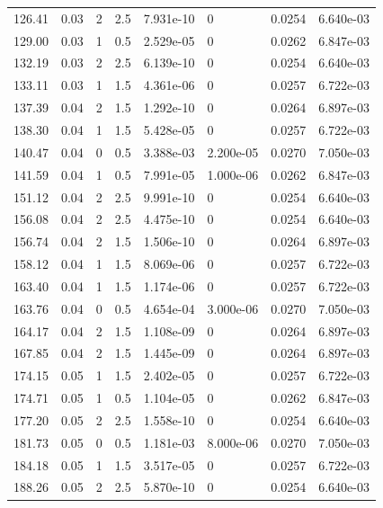 \documentclass[preview]{standalone}
\begin{document}
{{\begin{tabular}{L{1.2cm}C{1.2cm} C{0.3cm}C{0.5cm} C{1.4cm}C{1.4cm} C{1.4cm}C{1.4cm}}
  126.41  &  0.03  & 2     & 2.5 &  7.931e-10  & 0  & 0.0254 &  6.640e-03   \\ 
  129.00  &  0.03  & 1     & 0.5 &  2.529e-05  & 0  & 0.0262 &  6.847e-03   \\ 
  132.19  &  0.03  & 2     & 2.5 &  6.139e-10  & 0  & 0.0254 &  6.640e-03   \\ 
  133.11  &  0.03  & 1     & 1.5 &  4.361e-06  & 0  & 0.0257 &  6.722e-03   \\ 
  137.39  &  0.04  & 2     & 1.5 &  1.292e-10  & 0  & 0.0264 &  6.897e-03   \\ 
  138.30  &  0.04  & 1     & 1.5 &  5.428e-05  & 0  & 0.0257 &  6.722e-03   \\ 
  140.47  &  0.04  & 0     & 0.5 &  3.388e-03  & 2.200e-05  & 0.0270 &  7.050e-03   \\ 
  141.59  &  0.04  & 1     & 0.5 &  7.991e-05  & 1.000e-06  & 0.0262 &  6.847e-03   \\ 
  151.12  &  0.04  & 2     & 2.5 &  9.991e-10  & 0  & 0.0254 &  6.640e-03   \\ 
  156.08  &  0.04  & 2     & 2.5 &  4.475e-10  & 0  & 0.0254 &  6.640e-03   \\ 
  156.74  &  0.04  & 2     & 1.5 &  1.506e-10  & 0  & 0.0264 &  6.897e-03   \\ 
  158.12  &  0.04  & 1     & 1.5 &  8.069e-06  & 0  & 0.0257 &  6.722e-03   \\ 
  163.40  &  0.04  & 1     & 1.5 &  1.174e-06  & 0  & 0.0257 &  6.722e-03   \\ 
  163.76  &  0.04  & 0     & 0.5 &  4.654e-04  & 3.000e-06  & 0.0270 &  7.050e-03   \\ 
  164.17  &  0.04  & 2     & 1.5 &  1.108e-09  & 0  & 0.0264 &  6.897e-03   \\ 
  167.85  &  0.04  & 2     & 1.5 &  1.445e-09  & 0  & 0.0264 &  6.897e-03   \\ 
  174.15  &  0.05  & 1     & 1.5 &  2.402e-05  & 0  & 0.0257 &  6.722e-03   \\ 
  174.71  &  0.05  & 1     & 0.5 &  1.104e-05  & 0  & 0.0262 &  6.847e-03   \\ 
  177.20  &  0.05  & 2     & 2.5 &  1.558e-10  & 0  & 0.0254 &  6.640e-03   \\ 
  181.73  &  0.05  & 0     & 0.5 &  1.181e-03  & 8.000e-06  & 0.0270 &  7.050e-03   \\ 
  184.18  &  0.05  & 1     & 1.5 &  3.517e-05  & 0  & 0.0257 &  6.722e-03   \\ 
  188.26  &  0.05  & 2     & 2.5 &  5.870e-10  & 0  & 0.0254 &  6.640e-03   \\ 

\end{tabular}}}
\end{document}
